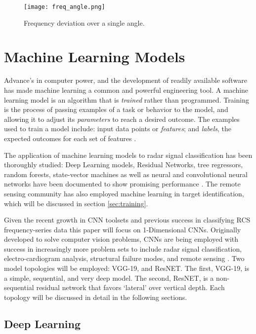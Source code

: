 	\begin{figure}[htbp]
	  \centering
	   \texttt{[image: freq\_angle.png]}
	  \caption[Missile RCS data, Angle Slice]{Frequency deviation over a single angle.}
	  \label{fig:frq_ang}
	\end{figure}

\section{Machine Learning Models}

	Advance's in computer power, and the development of readily available software has made machine learning a common and powerful engineering tool. A machine learning model is an algorithm that is \textit{trained} rather than programmed. Training is the process of passing examples of a task or behavior to the model, and allowing it to adjust its \textit{parameters} to reach a desired outcome. The examples used to train a model include:  input data points or \textit{features}; and \textit{labels}, the expected outcomes for each set of features \cite{Chollet}.

	The application of machine learning models to radar signal classification has been thoroughly studied:  Deep Learning models, Residual Networks, tree regressors, random forests, state-vector machines as well as neural and convolutional neural networks have been documented to show promising performance \cite{ML_Radar_Survey}. The remote sensing community has also employed machine learning in target identification, which will be discussed in section \ref{sec:training}.

	Given the recent growth in CNN toolsets and previous success in classifying RCS frequency-series data this paper will focus on 1-Dimensional CNNs\cite{ML_RCS}. Originally developed to solve computer vision problems, CNNs are being employed with success in increasingly more problem sets to include radar signal classification, electro-cardiogram analysis, structural failure modes, and remote sensing \cite{CNN_Survey}. Two model topologies will be employed:  VGG-19, and ResNET. The first, VGG-19, is a simple, sequential, and very deep model. The second, ResNET, is a non-sequential residual network that favors `lateral' over vertical depth. Each topology will be discussed in detail in the following sections.

	\subsection{ Deep Learning}

